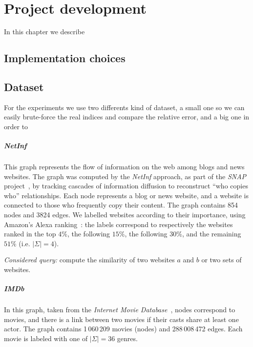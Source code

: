 
\chapter{Project development}

    In this chapter we describe  
    
    \section{Implementation choices}
    
    
    \section{Dataset}
    
    For the experiments we use two differents kind of dataset, a small one so we can easily brute-force the real indices and compare the relative error, and a big one in order to 
    
    \paragraph*{NetInf} This graph represents the flow of information on the web among blogs and news websites. The graph was computed by the \textit{NetInf} approach, as part of the \textit{SNAP} project~\cite{netinf}, by tracking cascades of information diffusion to reconstruct ``who copies who'' relationships. Each node represents a blog or news website, and a website is connected to those who frequently copy their content. The graph contains 854 nodes and 3824 edges. We labelled websites according to their importance, using Amazon's Alexa ranking~\cite{alexarank}: the labels correspond to respectively the websites ranked in the top $4\%$, the following $15\%$, the following $30\%$, and the remaining $51\%$ (i.e. $|\Sigma|=4$). 
    
    \textsl{Considered query:} compute the similarity of two websites $a$ and $b$ or two sets of websites.
    
    \paragraph*{IMDb} In this graph, taken from the \textit{Internet Movie Database}~\cite{imdb}, nodes correspond to movies, and there is a link between two movies if their casts share at least one actor. The graph contains 1\,060\,209 movies (nodes) and 288\,008\,472 edges. Each movie is labeled with one of $|\Sigma|=36$ genres. 
    
